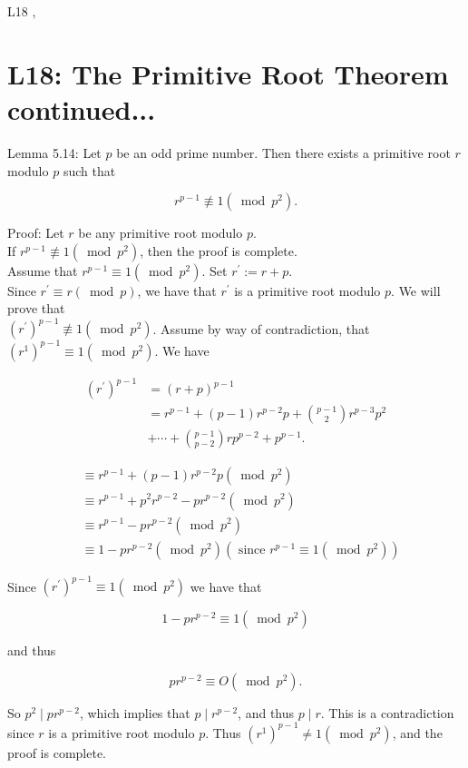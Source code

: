 \documentclass[10pt]{article}
\begin{document}
L18 ,

\section*{L18: The Primitive Root Theorem continued...}
Lemma 5.14: Let $p$ be an odd prime number. Then there exists a primitive root $r$ modulo $p$ such that

$$
r^{p-1} \not \equiv 1\left(\bmod p^{2}\right) .
$$

Proof: Let $r$ be any primitive root modulo $p$.\\
If $r^{p-1} \not \equiv 1\left(\bmod p^{2}\right)$, then the proof is complete.\\
Assume that $r^{p-1} \equiv 1\left(\bmod p^{2}\right)$. Set $r^{\prime}:=r+p$.\\
Since $r^{\prime} \equiv r(\bmod p)$, we have that $r^{\prime}$ is a primitive root modulo $p$. We will prove that\\
$\left(r^{\prime}\right)^{p-1} \not \equiv 1\left(\bmod p^{2}\right)$. Assume by way of contradiction, that $\left(r^{1}\right)^{p-1} \equiv 1\left(\bmod p^{2}\right)$. We have

$$
\begin{aligned}
\left(r^{\prime}\right)^{p-1} & =(r+p)^{p-1} \\
& =r^{p-1}+(p-1) r^{p-2} p+\binom{p-1}{2} r^{p-3} p^{2} \\
& +\cdots+\binom{p-1}{p-2} r p^{p-2}+p^{p-1} .
\end{aligned}
$$

$$
\begin{aligned}
& \equiv r^{p-1}+(p-1) r^{p-2} p\left(\bmod p^{2}\right) \\
& \equiv r^{p-1}+p^{2} r^{p-2}-p r^{p-2}\left(\bmod p^{2}\right) \\
& \equiv r^{p-1}-p r^{p-2}\left(\bmod p^{2}\right) \\
& \equiv 1-p r^{p-2}\left(\bmod p^{2}\right)\left(\text { since } r^{p-1} \equiv 1\left(\bmod p^{2}\right)\right)
\end{aligned}
$$

Since $\left(r^{\prime}\right)^{p-1} \equiv 1\left(\bmod p^{2}\right)$ we have that

$$
1-p r^{p-2} \equiv 1\left(\bmod p^{2}\right)
$$

and thus

$$
p r^{p-2} \equiv O\left(\bmod p^{2}\right) .
$$

So $p^{2} \mid p r^{p-2}$, which implies that $p \mid r^{p-2}$, and thus $p \mid r$. This is a contradiction since $r$ is a primitive root modulo $p$. Thus $\left(r^{1}\right)^{p-1} \neq 1\left(\bmod p^{2}\right)$, and the proof is complete.
\end{document}
